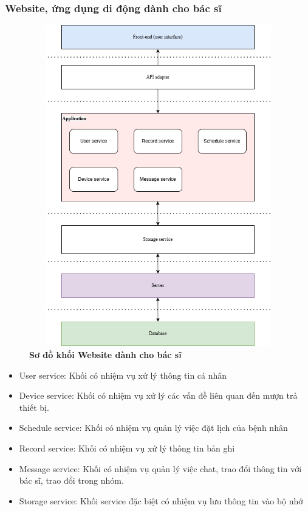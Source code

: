 \subsubsection{Website, ứng dụng di động dành cho bác sĩ}
\begin{figure}[H]
  \centering
  \includegraphics[width=12cm,height=14cm]{Images/System/fmECG_architecture-Doctors.drawio.png}
  \caption[Sơ đồ khối Website dành cho bác sĩ]{\bfseries \fontsize{12pt}{0pt}\selectfont Sơ đồ khối Website dành cho bác sĩ}
  \label{fmECG_architecture-Doctor} %
\end{figure}
\begin{adjustwidth}{1.5em}{}
  \begin{itemize}
    \item User service: Khối có nhiệm vụ xử lý thông tin cá nhân
    \item Device service: Khối có nhiệm vụ xử lý các vấn đề liên quan đến mượn trả thiết bị.
    \item Schedule service: Khối có nhiệm vụ quản lý việc đặt lịch của bệnh nhân
    \item Record service: Khối có nhiệm vụ xử lý thông tin bản ghi
    \item Message service: Khối có nhiệm vụ quản lý việc chat, trao đổi thông tin với bác sĩ,
    trao đổi trong nhóm.
    \item Storage service: Khối service đặc biệt có nhiệm vụ lưu thông tin vào bộ nhớ
  \end{itemize}
\end{adjustwidth}


